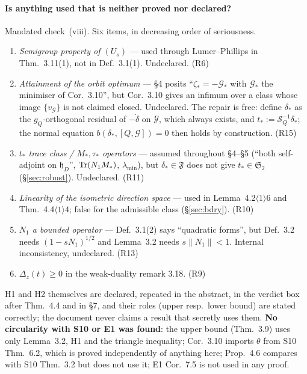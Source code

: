 \documentclass[11pt]{article}
\newcommand{\hh}{\mathfrak h}
\newcommand{\SLD}{\mathcal S_Q}
\newcommand{\Stwo}{\mathfrak S_2}
\begin{document}
\paragraph{Is anything used that is neither proved nor declared?}  Mandated check~(viii).
Six items, in decreasing order of seriousness.
\begin{enumerate}[leftmargin=1.8em,itemsep=1pt]
\item \emph{Semigroup property of $(U_s)$} --- used through Lumer--Phillips in
 Thm.~3.11(1), not in Def.~3.1(1).  Undeclared.  (R6)
\item \emph{Attainment of the orbit optimum} --- \S4 posits ``$\zeta_*=-\mathcal G_*$ with
 $\mathcal G_*$ the minimiser of Cor.~3.10'', but Cor.~3.10 gives an infimum over a class
 whose image $\{v_{\mathcal G}\}$ is not claimed closed.  Undeclared.  The repair is free:
 define $\delta_*$ as the $g_Q$-orthogonal residual of $-\dot\delta$ on
 $\overline{\mathcal Y}$, which always exists, and $t_*:=\SLD^{-1}\delta_*$; the normal
 equation $b(\delta_*,[Q,\mathcal G])=0$ then holds by construction.  (R15)
\item \emph{$t_*$ trace class / $M_*,\tau_*$ operators} --- assumed throughout \S4--\S5
 (``both self-adjoint on $\hh_D$'', $\operatorname{Tr}(N_1M_*)$, $\lambda_{\min}$), but
 $\delta_*\in\mathfrak F$ does not give $t_*\in\Stwo$ (\S\ref{sec:robust}).  Undeclared.  (R11)
\item \emph{Linearity of the isometric direction space} --- used in Lemma~4.2$\langle1\rangle6$
 and Thm.~4.4$\langle1\rangle4$; false for the admissible class (\S\ref{sec:bdry}).  (R10)
\item \emph{$N_1$ a bounded operator} --- Def.~3.1(2) says ``quadratic forms'', but
 Def.~3.2 needs $(1-sN_1)^{1/2}$ and Lemma~3.2 needs $s\|N_1\|<1$.  Internal
 inconsistency, undeclared.  (R13)
\item \emph{$\Delta_z(t)\ge0$} in the weak-duality remark 3.18.  (R9)
\end{enumerate}
H1 and H2 themselves are declared, repeated in the abstract, in the verdict box after
Thm.~4.4 and in \S7, and their roles (upper resp.\ lower bound) are stated correctly; the
document never claims a result that secretly uses them.  \textbf{No circularity with S10 or
E1 was found}: the upper bound (Thm.~3.9) uses only Lemma~3.2, H1 and the triangle
inequality; Cor.~3.10 imports $\theta$ from S10 Thm.~6.2, which is proved independently of
anything here; Prop.~4.6 compares with S10 Thm.~3.2 but does not use it; E1 Cor.~7.5 is not
used in any proof.
\end{document}
